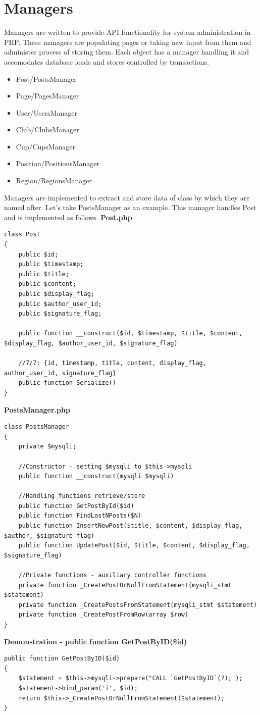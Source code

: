 \section{Managers}
Managers are written to provide API functionality for system administration in PHP. These managers are populating pages or taking new input from them and administer process of storing them. Each object has a manager handling it and accomodates database loads and stores controlled by transactions.
\begin{itemize}
    \item Post/PostsManager
    \item Page/PagesManager
    \item User/UsersManager
    \item Club/ClubsManager
    \item Cup/CupsManager
    \item Position/PositionsManager
    \item Region/RegionsManager
\end{itemize}
Managers are implemented to extract and store data of class by which they are named after. Let's take PostsManager as an example. This manager handles Post and is implemented as follows.
\newline
\textbf{Post.php}
\begin{lstlisting}
class Post
{
    public $id;
    public $timestamp;
    public $title;
    public $content;
    public $display_flag;
    public $author_user_id;
	public $signature_flag;

    public function __construct($id, $timestamp, $title, $content, $display_flag, $author_user_id, $signature_flag)

	//7/7: {id, timestamp, title, content, display_flag, author_user_id, signature_flag}
	public function Serialize()
}

\end{lstlisting}
\textbf{PostsManager.php} 
\begin{lstlisting}
class PostsManager
{
	private $mysqli;

    //Constructor - setting $mysqli to $this->mysqli
	public function __construct(mysqli $mysqli)

    //Handling functions retrieve/store  
	public function GetPostById($id)
  	public function FindLastNPosts($N)
	public function InsertNewPost($title, $content, $display_flag, $author, $signature_flag)
    public function UpdatePost($id, $title, $content, $display_flag, $signature_flag)

    //Private functions - auxiliary controller functions
	private function _CreatePostOrNullFromStatement(mysqli_stmt $statement)
	private function _CreatePostsFromStatement(mysqli_stmt $statement)
	private function _CreatePostFromRow(array $row)
}
\end{lstlisting}
\textbf{Demonstration - public function GetPostByID(\$id)}
\begin{lstlisting}
public function GetPostByID($id)
{
	$statement = $this->mysqli->prepare("CALL `GetPostByID`(?);");
	$statement->bind_param('i', $id);
	return $this->_CreatePostOrNullFromStatement($statement);
}
\end{lstlisting}
